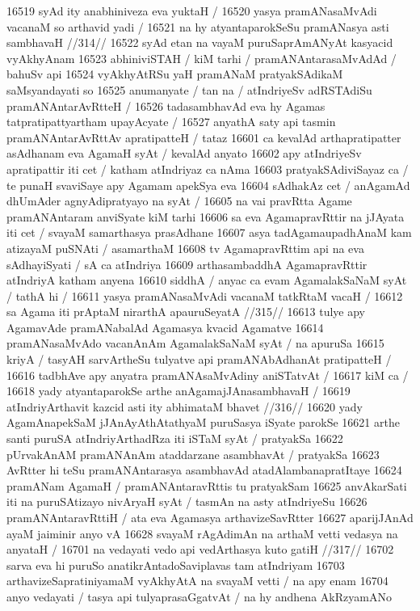 16519 syAd ity anabhiniveza eva yuktaH /
16520 	yasya pramANasaMvAdi vacanaM so arthavid yadi / 
16521 	na hy atyantaparokSeSu pramANasya asti sambhavaH //314//
16522 syAd etan na vayaM puruSaprAmANyAt kasyacid vyAkhyAnam 
16523 abhiniviSTAH / kiM tarhi / pramANAntarasaMvAdAd / bahuSv api 
16524 vyAkhyAtRSu yaH pramANaM pratyakSAdikaM saMsyandayati so
16525 anumanyate / tan na / atIndriyeSv adRSTAdiSu pramANAntarAvRtteH /
16526 tadasambhavAd eva hy Agamas tatpratipattyartham upayAcyate /  
16527 anyathA saty api tasmin pramANAntarAvRttAv apratipatteH / tataz 
16601 ca kevalAd arthapratipatter asAdhanam eva AgamaH syAt / kevalAd anyato
16602 apy atIndriyeSv apratipattir iti cet / katham atIndriyaz ca nAma 
16603 pratyakSAdiviSayaz ca / te punaH svaviSaye apy Agamam apekSya eva
16604 sAdhakAz cet / anAgamAd dhUmAder agnyAdipratyayo na syAt / 
16605 na vai pravRtta Agame pramANAntaram anviSyate kiM tarhi
16606 sa eva AgamapravRttir na jJAyata iti cet / svayaM samarthasya prasAdhane
16607 asya tadAgamaupadhAnaM kam atizayaM puSNAti / asamarthaM 
16608 tv AgamapravRttim api na eva sAdhayiSyati / sA ca atIndriya
16609 arthasambaddhA AgamapravRttir atIndriyA katham anyena
16610 siddhA / anyac ca evam AgamalakSaNaM syAt / tathA hi /
16611 	yasya pramANasaMvAdi vacanaM tatkRtaM vacaH /  
16612 	sa Agama iti prAptaM nirarthA apauruSeyatA //315//
16613 tulye apy AgamavAde pramANabalAd Agamasya kvacid Agamatve
16614 pramANasaMvAdo vacanAnAm AgamalakSaNaM syAt / na apuruSa
16615 kriyA / tasyAH sarvArtheSu tulyatve api pramANAbAdhanAt pratipatteH /
16616 tadbhAve apy anyatra pramANAsaMvAdiny aniSTatvAt /  
16617 kiM ca /
16618 	yady atyantaparokSe arthe anAgamajJAnasambhavaH / 
16619 	atIndriyArthavit kazcid asti ity abhimataM bhavet //316// 
16620 yady AgamAnapekSaM jJAnAyAthAtathyaM puruSasya iSyate parokSe  
16621 arthe santi puruSA atIndriyArthadRza iti iSTaM syAt / pratyakSa
16622 pUrvakAnAM pramANAnAm ataddarzane asambhavAt / pratyakSa
16623 AvRtter hi teSu pramANAntarasya asambhavAd atadAlambanapratItaye
16624 pramANam AgamaH / pramANAntaravRttis tu pratyakSam
16625 anvAkarSati iti na puruSAtizayo nivAryaH syAt / tasmAn na asty atIndriyeSu
16626 pramANAntaravRttiH / ata eva Agamasya arthavizeSavRtter
16627 aparijJAnAd ayaM jaiminir anyo vA  
16628 	svayaM rAgAdimAn na arthaM vetti vedasya na anyataH /  
16701 	na vedayati vedo api vedArthasya kuto gatiH //317// 
16702 sarva eva hi puruSo anatikrAntadoSaviplavas tam atIndriyam
16703 arthavizeSapratiniyamaM vyAkhyAtA na svayaM vetti / na apy enam
16704 anyo vedayati / tasya api tulyaprasaGgatvAt / na hy andhena AkRzyamANo 
